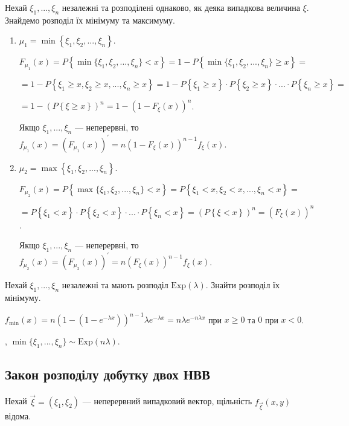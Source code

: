 Нехай $\xi_1, ..., \xi_n$ незалежні та розподілені однаково, як деяка випадкова величина $\xi$.
Знайдемо розподіл їх мінімуму та максимуму.
\begin{enumerate}
    \item $\mu_1 = \min\left\{\xi_1, \xi_2, ..., \xi_n\right\}$.

    $F_{\mu_1} (x) = P \left\{ \min\{\xi_1, \xi_2, ..., \xi_n\} < x \right\} =
    1 - P \left\{ \min\{\xi_1, \xi_2, ..., \xi_n\} \geq x \right\} =$

    $ = 1 - P \left\{ \xi_1 \geq x, \xi_2 \geq x, ..., \xi_n \geq x \right\} = 
    1 - P\left\{ \xi_1 \geq x\right\} \cdot P\left\{ \xi_2 \geq x\right\} \cdot ... \cdot P\left\{ \xi_n \geq x\right\} = $
    
    $ = 1 - (P\left\{ \xi \geq x\right\})^n = 1 - (1- F_\xi (x))^n$.

    Якщо $\xi_1, ..., \xi_n$ --- неперервні, то $f_{\mu_1} (x) = \left( F_{\mu_1} (x)\right)^\prime = n (1- F_\xi (x))^{n-1} f_\xi(x)$.
    \item $\mu_2 = \max\left\{\xi_1, \xi_2, ..., \xi_n\right\}$.

    $F_{\mu_2} (x) = P \left\{ \max\{\xi_1, \xi_2, ..., \xi_n\} < x \right\} =
    P \left\{ \xi_1 < x, \xi_2 < x, ..., \xi_n < x \right\} = $

    $ = P\left\{ \xi_1 < x\right\} \cdot P\left\{ \xi_2 < x\right\} \cdot ... \cdot P\left\{ \xi_n < x\right\} =
    (P\left\{ \xi < x\right\})^n = (F_\xi (x))^n$.

    Якщо $\xi_1, ..., \xi_n$ --- неперервні, то $f_{\mu_2} (x) = \left( F_{\mu_2} (x)\right)^\prime = n (F_\xi (x))^{n-1} f_\xi(x)$.
\end{enumerate}

\begin{example}
    Нехай $\xi_1, ..., \xi_n$ незалежні та мають розподіл $\mathrm{Exp}(\lambda)$. Знайти розподіл їх мінімуму.

    \noindent$f_{\min}(x) = n (1-(1-e^{-\lambda x}))^{n-1} \lambda e^{-\lambda x} = n \lambda e^{-n\lambda x}$ при $x \geq 0$ та $0$ при $x < 0$.
    
    , $\min\{\xi_1, ..., \xi_n\} \sim \mathrm{Exp} (n \lambda)$.
\end{example}

\subsection{Закон розподілу добутку двох НВВ}
Нехай $\vec{\xi} = (\xi_1, \xi_2)$ --- неперервний випадковий вектор, щільність
$f_{\vec{\xi}}(x, y)$ відома.

